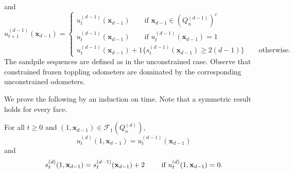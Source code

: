 \documentclass[12pt]{amsart}
\begin{document}
and
\[
u_{t+1}^{(d-1)}(\mathbf x_{d-1}) = 
\begin{cases}
u_t^{(d-1)}(\mathbf x_{d-1}) \qquad
\mbox{if $\mathbf x_{d-1}\in(Q_n^{(d-1)})^c$} \\
u_t^{(d-1)}(\mathbf x_{d-1}) \qquad \mbox{if $u_t^{(d-1)}(\mathbf{x}_{d-1}) = 1$} \\
u_t^{(d-1)}(\mathbf x_{d-1}) + 1\{s_t^{(d-1)}(\mathbf x_{d-1}) \geq 2 (d-1)\} \qquad \mbox{otherwise}.
\end{cases}
\]
The sandpile sequences are defined as in the unconstrained case. 
Observe that constrained frozen toppling odometers are dominated by the corresponding unconstrained odometers.

We prove the following by an induction on time. Note that a symmetric result holds for every face. 
\begin{prop} \label{prop:dimensional_reduction}
	For all $t \geq 0$ and $(1, \mathbf{x}_{d-1}) \in \mathcal{F}_1(Q_n^{(d)})$, 
	\begin{equation} \label{eq:odometer_reduction}
	u_t^{(d)}(1,\mathbf{x}_{d-1}) = u_t^{(d-1)}(\mathbf{x}_{d-1})
	\end{equation}
	and
	\begin{equation} \label{eq:sandpile_reduction}
	s_t^{(d)}(1,\mathbf{x}_{d-1}) = s_t^{(d-1)}(\mathbf{x}_{d-1}) + 2 \qquad \mbox{ if $ u_t^{(d)}(1,\mathbf{x}_{d-1}) = 0 $}.
	\end{equation}
\end{prop}
\end{document}

